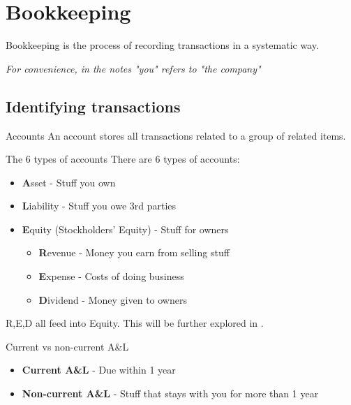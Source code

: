 \section{Bookkeeping}
\label{sec:record}

Bookkeeping is the process of recording transactions in a systematic way.

\begin{small}
    \textit{For convenience, in the notes "you" refers to "the company"}
\end{small}

\subsection{Identifying transactions}
\label{subsec:identify}

\begin{definition}
    {Accounts}
    An account stores all transactions related to a group of related items.
    \label{def:acc}
\end{definition}

\begin{theorem}
    {The 6 types of accounts}
    There are 6 types of accounts:
    \begin{itemize}
        \item \textbf{A}sset - Stuff you own
        \item \textbf{L}iability - Stuff you owe 3rd parties
        \item \textbf{E}quity (Stockholders' Equity) - Stuff for owners
              \begin{itemize}
                  \item \textbf{R}evenue - Money you earn from selling stuff
                  \item \textbf{E}xpense - Costs of doing business
                  \item \textbf{D}ividend - Money given to owners
              \end{itemize}
    \end{itemize}
    \label{thm:acc_types}
    R,E,D all feed into Equity. This will be further explored in .
\end{theorem}

\begin{knBox}
    {Current vs non-current A\&L}
    \begin{itemize}
        \item \textbf{Current A\&L} - Due within 1 year
        \item \textbf{Non-current A\&L} - Stuff that stays with you for more than 1 year
    \end{itemize}
\end{knBox}

